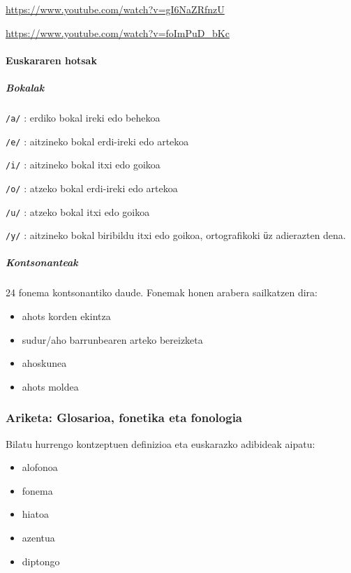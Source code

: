 \documentclass[
]{book}
\providecommand{\tightlist}{%
  \setlength{\itemsep}{0pt}\setlength{\parskip}{0pt}}
\begin{document}
\url{https://www.youtube.com/watch?v=gI6NaZRfnzU}

\url{https://www.youtube.com/watch?v=foImPuD_bKc}

\hypertarget{euskararen-hotsak}{%
\paragraph{Euskararen hotsak}\label{euskararen-hotsak}}

\hypertarget{bokalak}{%
\subparagraph{Bokalak}\label{bokalak}}

\texttt{/a/}
: erdiko bokal ireki edo behekoa

\texttt{/e/}
: aitzineko bokal erdi-ireki edo artekoa

\texttt{/i/}
: aitzineko bokal itxi edo goikoa

\texttt{/o/}
: atzeko bokal erdi-ireki edo artekoa

\texttt{/u/}
: atzeko bokal itxi edo goikoa

\texttt{/y/}
: aitzineko bokal biribildu itxi edo goikoa, ortografikoki \texttt{ü}z adierazten dena.

\hypertarget{kontsonanteak}{%
\subparagraph{Kontsonanteak}\label{kontsonanteak}}

24 fonema kontsonantiko daude. Fonemak honen arabera sailkatzen dira:

\begin{itemize}
\tightlist
\item
  ahots korden ekintza
\item
  sudur/aho barrunbearen arteko bereizketa
\item
  ahoskunea
\item
  ahots moldea
\end{itemize}

\hypertarget{T2A3}{%
\subsubsection*{Ariketa: Glosarioa, fonetika eta fonologia}\label{T2A3}}

Bilatu hurrengo kontzeptuen definizioa eta euskarazko adibideak aipatu:

\begin{itemize}
\tightlist
\item
  alofonoa
\item
  fonema
\item
  hiatoa
\item
  azentua
\item
  diptongo
\end{itemize}
\end{document}

